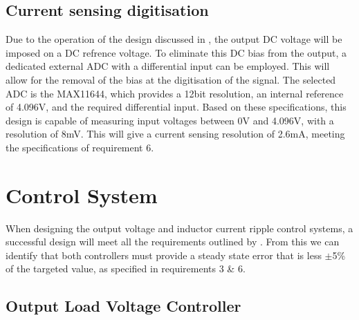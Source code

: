 
\subsection*{Current sensing digitisation}\label{S:current_sense_ADC_design}

Due to the operation of the design discussed in , the output DC voltage will be imposed on a DC refrence voltage. To eliminate this DC bias from the output, a dedicated external ADC with a differential input can be employed. This will allow for the removal of the bias at the digitisation of the signal. The selected ADC is the MAX11644, which provides a 12bit resolution, an internal reference of 4.096V, and the required differential input. 
Based on these specifications, this design is capable of measuring input voltages between 0V and 4.096V, with a resolution of 8mV. This will give a current sensing resolution of 2.6mA, meeting the specifications of requirement 6.




%
%

\section{Control System}\label{S:control_design}

When designing the output voltage and inductor current ripple control systems, a successful design will meet all the requirements outlined by . From this we can identify that both controllers must provide a steady state error that is less $\pm$5\% of the targeted value, as specified in requirements 3 \& 6. 

\subsection{Output Load Voltage Controller}\label{S:output_control_design}

